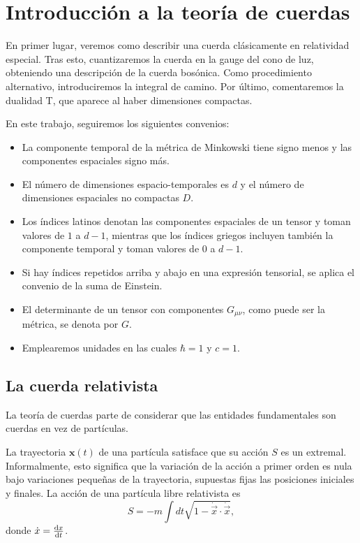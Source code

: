 \chapter{Introducción a la teoría de cuerdas}

En primer lugar, veremos como describir una cuerda clásicamente en relatividad especial.
Tras esto, cuantizaremos la cuerda en la gauge del cono de luz, obteniendo una descripción de la cuerda bosónica.
Como procedimiento alternativo, introduciremos la integral de camino.
Por último, comentaremos la dualidad T, que aparece al haber dimensiones compactas.

En este trabajo, seguiremos los siguientes convenios:
\begin{itemize}
  \item La  componente temporal de la métrica de Minkowski tiene signo menos y las componentes espaciales signo más.
  \item El número de dimensiones espacio-temporales es $d$ y el número de dimensiones espaciales no compactas $D$.
  \item Los índices latinos denotan las componentes espaciales de un tensor y toman valores de $1$ a $d-1$, mientras que los índices griegos
  incluyen también la componente temporal y toman valores de $0$ a $d-1$. 
  \item Si hay índices repetidos arriba y abajo en una expresión tensorial, se aplica el convenio de la suma de Einstein.
  \item El determinante de un tensor con componentes $G_{\mu\nu}$, como puede ser la métrica, se denota por $G$.
  \item Emplearemos unidades en las cuales $\hbar = 1$ y $c=1$.
\end{itemize}

\section{La cuerda relativista}

La teoría de cuerdas parte de considerar que las entidades fundamentales son cuerdas
en vez de partículas. 

La trayectoria $\mathbf x(t)$ de una partícula satisface que su acción $S$ es un extremal.
Informalmente, esto significa que la variación de la acción a primer orden es nula bajo
variaciones pequeñas de la trayectoria, supuestas fijas las posiciones iniciales y finales.
La acción de una partícula libre relativista es
\begin{equation}
  S=-m\int dt \sqrt{1-\dot {\vec{x}} \cdot \dot {\vec{x}}},
\end{equation}
donde $\dot x = \dv{x}{t}$.

